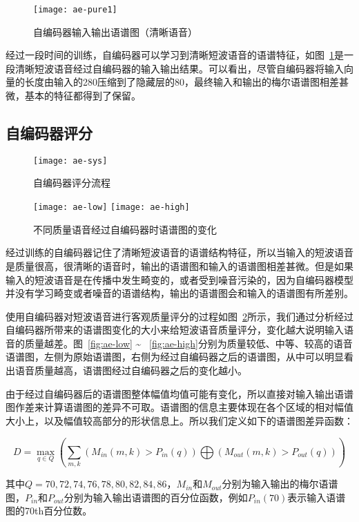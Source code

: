 \begin{figure}
\centering
\texttt{[image: ae-pure1]}
\caption{自编码器输入输出语谱图（清晰语音）\label{fig:ae-pure1}}
\end{figure}

经过一段时间的训练，自编码器可以学习到清晰短波语音的语谱特征，如图~\ref{fig:ae-pure1}是一段清晰短波语音经过自编码器的输入输出结果。可以看出，尽管自编码器将输入向量的长度由输入的280压缩到了隐藏层的80，最终输入和输出的梅尔语谱图相差甚微，基本的特征都得到了保留。

\subsection{自编码器评分}


\begin{figure}
\centering
\texttt{[image: ae-sys]}
\caption{自编码器评分流程 \label{fig:ae-sys}}
\end{figure}

\begin{figure}
\centering
{} {
    \texttt{[image: ae-low]}
}
 {
    \texttt{[image: ae-high]}
}
\caption{不同质量语音经过自编码器时语谱图的变化\label{fig:ae-diffs}}
\end{figure}

经过训练的自编码器记住了清晰短波语音的语谱结构特征，所以当输入的短波语音是质量很高，很清晰的语音时，输出的语谱图和输入的语谱图相差甚微。但是如果输入的短波语音是在传播中发生畸变的，或者受到噪音污染的，因为自编码器模型并没有学习畸变或者噪音的语谱结构，输出的语谱图会和输入的语谱图有所差别。

使用自编码器对短波语音进行客观质量评分的过程如图~\ref{fig:ae-sys}所示，我们通过分析经过自编码器所带来的语谱图变化的大小来给短波语音质量评分，变化越大说明输入语音的质量越差。图~\ref{fig:ae-low} \~ ~\ref{fig:ae-high}分别为质量较低、中等、较高的语音语谱图，左侧为原始语谱图，右侧为经过自编码器之后的语谱图，从中可以明显看出语音质量越高，语谱图经过自编码器之后的变化越小。

由于经过自编码器后的语谱图整体幅值均值可能有变化，所以直接对输入输出语谱图作差来计算语谱图的差异不可取。语谱图的信息主要体现在各个区域的相对幅值大小上，以及幅值较高部分的形状信息上。所以我们定义如下的语谱图差异函数：

\begin{equation}
D = \max_{q \in Q}\left(\sum_{m, k} (M_{in}(m,k) > P_{in}(q)) \bigoplus (M_{out}(m,k) > P_{out}(q))\right)
\end{equation}

其中$Q={70,72,74,76,78,80,82,84,86}$，$M_{in}$和$M_{out}$分别为输入输出的梅尔语谱图，$P_{in}$和$P_{out}$分别为输入输出语谱图的百分位函数，例如$P_{in}(70)$表示输入语谱图的70th百分位数。
